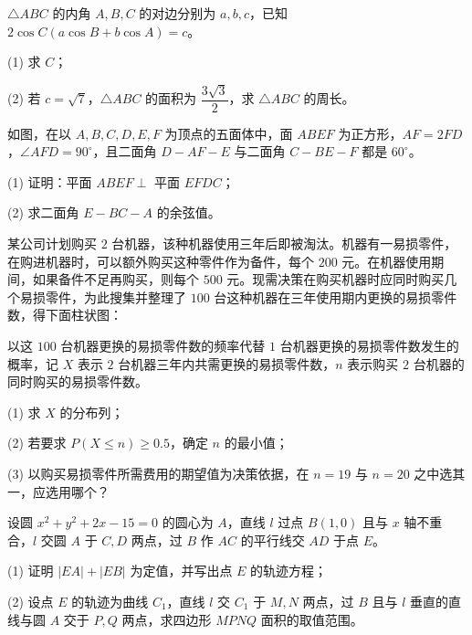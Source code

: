 \begin{question}
$\triangle ABC$ 的内角 $A,B,C$ 的对边分别为 $a,b,c$，已知 $2\cos C(a\cos B+b\cos A)=c$。

   (1) 求 $C$；

   (2) 若 $c=\sqrt7$，$\triangle ABC$ 的面积为 $\dfrac{3\sqrt3}{2}$，求 $\triangle ABC$ 的周长。

\Needspace{0.4\textheight}
\end{question}
\begin{question}
如图，在以 $A,B,C,D,E,F$ 为顶点的五面体中，面 $ABEF$ 为正方形，$AF=2FD$，$\angle AFD=90^\circ$，且二面角 $D-AF-E$ 与二面角 $C-BE-F$ 都是 $60^\circ$。
\nopagebreak[4]
\begin{center}\end{center}
\nopagebreak[4]
   (1) 证明：平面 $ABEF\perp$ 平面 $EFDC$；

   (2) 求二面角 $E-BC-A$ 的余弦值。

\Needspace{0.4\textheight}
\end{question}
\begin{question}
某公司计划购买 $2$ 台机器，该种机器使用三年后即被淘汰。机器有一易损零件，在购进机器时，可以额外购买这种零件作为备件，每个 $200$ 元。在机器使用期间，如果备件不足再购买，则每个 $500$ 元。现需决策在购买机器时应同时购买几个易损零件，为此搜集并整理了 $100$ 台这种机器在三年使用期内更换的易损零件数，得下面柱状图：
\nopagebreak[4]
\begin{center}\end{center}
\nopagebreak[4]
   以这 $100$ 台机器更换的易损零件数的频率代替 $1$ 台机器更换的易损零件数发生的概率，记 $X$ 表示 $2$ 台机器三年内共需更换的易损零件数，$n$ 表示购买 $2$ 台机器的同时购买的易损零件数。

   (1) 求 $X$ 的分布列；

   (2) 若要求 $P(X\leq n)\geq0.5$，确定 $n$ 的最小值；

   (3) 以购买易损零件所需费用的期望值为决策依据，在 $n=19$ 与 $n=20$ 之中选其一，应选用哪个？

\end{question}
\begin{question}
设圆 $x^2+y^2+2x-15=0$ 的圆心为 $A$，直线 $l$ 过点 $B(1,0)$ 且与 $x$ 轴不重合，$l$ 交圆 $A$ 于 $C,D$ 两点，过 $B$ 作 $AC$ 的平行线交 $AD$ 于点 $E$。

   (1) 证明 $|EA|+|EB|$ 为定值，并写出点 $E$ 的轨迹方程；

   (2) 设点 $E$ 的轨迹为曲线 $C_1$，直线 $l$ 交 $C_1$ 于 $M,N$ 两点，过 $B$ 且与 $l$ 垂直的直线与圆 $A$ 交于 $P,Q$ 两点，求四边形 $MPNQ$ 面积的取值范围。

\end{question}
